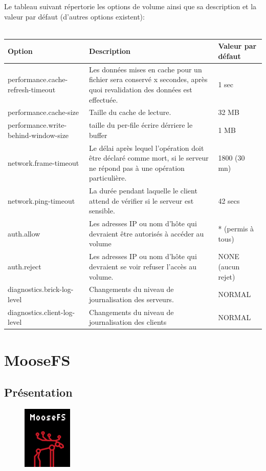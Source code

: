 \documentclass[12pt]{report}
\begin{document}
Le tableau suivant répertorie les options de volume ainsi que sa description et la valeur par défaut (d'autres options existent):\\\\
\begin{tabular}{|p{5cm}|p{8cm}|m{4cm}|}
  \hline
  Option & Description & Valeur par défaut \\
  \hline
  performance.cache-refresh-timeout & Les données mises en cache pour un fichier sera conservé x secondes, après quoi revalidation des données est effectuée. & 1 sec \\
  \hline
  performance.cache-size & Taille du cache de lecture. & 32 MB \\
  \hline
  performance.write-behind-window-size & taille du per-file écrire dérriere le buffer & 1 MB \\
  \hline
  network.frame-timeout & Le délai après lequel l'opération doit être déclaré comme mort, si le serveur ne répond pas à une opération particulière. & 1800 (30 mn) \\
  \hline
  network.ping-timeout & La durée pendant laquelle le client attend de vérifier si le serveur est sensible. & 42 secs  \\
  \hline
  auth.allow & Les adresses IP ou nom d'hôte qui devraient être autorisés à accéder au volume & * (permis à tous) \\
  \hline
  auth.reject & Les adresses IP ou nom d'hôte qui devraient se voir refuser l'accès au volume. & NONE (aucun rejet) \\
  \hline
  diagnostics.brick-log-level & Changements du niveau de journalisation des serveurs. & NORMAL \\
  \hline
  diagnostics.client-log-level & Changements du niveau de journalisation des clients & NORMAL \\
  \hline
  
\end{tabular}

	\chapter{MooseFS}
		\section{Présentation}

			\begin{figure}[H]
				\begin{center}
					\includegraphics[width=0.15\linewidth]{images/moosefs.png}
				\end{center}
			\end{figure}
	
\end{document}

